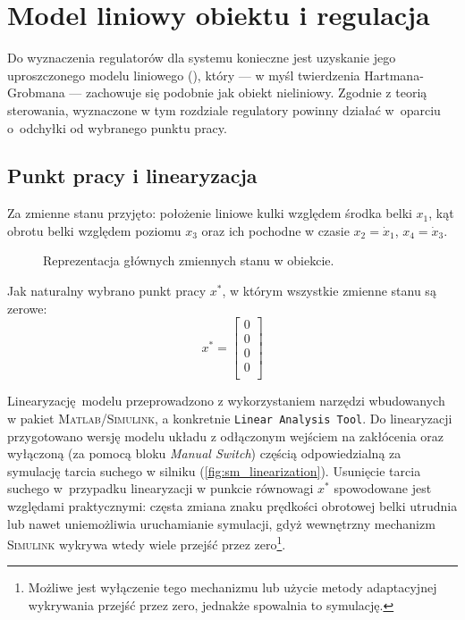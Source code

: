 \chapter{Model liniowy obiektu i regulacja}
\label{cha:ch6_model_liniowy}

Do wyznaczenia regulatorów dla systemu konieczne jest uzyskanie jego uproszczonego modelu liniowego (\cite{TEORIASTER}), który --- w myśl twierdzenia Hartmana-Grobmana --- zachowuje się podobnie jak obiekt nieliniowy. Zgodnie z teorią sterowania, wyznaczone w tym rozdziale regulatory powinny działać w~oparciu o~odchyłki od wybranego punktu pracy.

\section{Punkt pracy i linearyzacja}
\label{sec:ch6_punkt_pracy_linearyzacja}

Za zmienne stanu przyjęto: położenie liniowe kulki względem środka belki $x_1$, kąt obrotu belki względem poziomu $x_3$ oraz ich pochodne w czasie $x_2 = \dot{x}_1$, $x_4 = \dot{x}_3$.

\begin{figure}[h]
    \centering
    
    \caption{Reprezentacja głównych zmiennych stanu w obiekcie.}
    \label{fig:zmienne_stanu}
\end{figure}

Jak naturalny wybrano punkt pracy $x^*$, w którym wszystkie zmienne stanu są zerowe:
\begin{equation}
    x^* = \begin{bmatrix}
    0 \\
    0 \\
    0 \\
    0 \\
    \end{bmatrix}
\end{equation}

Linearyzację modelu przeprowadzono z wykorzystaniem narzędzi wbudowanych w pakiet \textsc{Mat\-lab/Si\-mu\-link}, a konkretnie \texttt{Linear Analysis Tool}. Do linearyzacji przygotowano wersję mo\-de\-lu układu z odłączonym wejściem na zakłócenia oraz wyłączoną (za pomocą bloku \textit{Manual Switch}) częścią odpowiedzialną za symulację tarcia suchego w silniku (\cref{fig:sm_linearization}). Usunięcie tarcia suchego w~przypadku linearyzacji w punkcie równowagi $x^*$ spowodowane jest względami praktycznymi: częsta zmiana znaku prędkości obrotowej belki utrudnia lub nawet uniemożliwia uruchamianie symulacji, gdyż wewnętrzny mechanizm \textsc{Simulink} wykrywa wtedy wiele przejść przez zero\footnote{Możliwe jest wyłączenie tego mechanizmu lub użycie metody adaptacyjnej wykrywania przejść przez zero, jednakże spowalnia to symulację.}.

